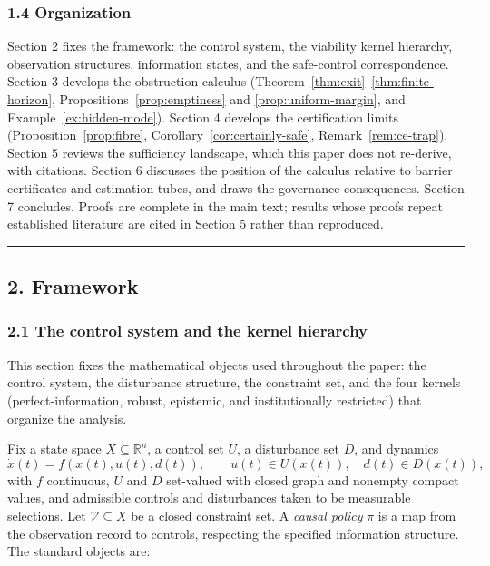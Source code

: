 \documentclass[11pt]{article}
\theoremstyle{definition}
\begin{document}
\subsubsection{1.4 Organization}\label{organization}

Section 2 fixes the framework: the control system, the viability kernel
hierarchy, observation structures, information states, and the
safe-control correspondence. Section 3 develops the obstruction calculus (Theorem~\ref{thm:exit}--\ref{thm:finite-horizon}, Propositions~\ref{prop:emptiness} and \ref{prop:uniform-margin}, and Example~\ref{ex:hidden-mode}). Section 4 develops the certification limits
(Proposition~\ref{prop:fibre}, Corollary~\ref{cor:certainly-safe}, Remark~\ref{rem:ce-trap}). Section 5 reviews the sufficiency
landscape, which this paper does not re-derive, with citations. Section
6 discusses the position of the calculus relative to barrier
certificates and estimation tubes, and draws the governance
consequences. Section 7 concludes. Proofs are complete in the main text;
results whose proofs repeat established literature are cited in Section 5 rather than reproduced.

\begin{center}\rule{0.5\linewidth}{0.5pt}\end{center}

\subsection{2. Framework}\label{framework}

\subsubsection{2.1 The control system and the kernel
hierarchy}\label{the-control-system-and-the-kernel-hierarchy}

This section fixes the mathematical objects used throughout the paper:
the control system, the disturbance structure, the constraint set, and
the four kernels (perfect-information, robust, epistemic, and
institutionally restricted) that organize the analysis.

Fix a state space \(X \subseteq \mathbb{R}^n\), a control set \(U\), a
disturbance set \(D\), and dynamics
\[\dot x(t) = f(x(t), u(t), d(t)), \qquad u(t) \in U(x(t)), \quad d(t) \in D(x(t)),\]
with \(f\) continuous, \(U\) and \(D\) set-valued with closed graph and
nonempty compact values, and admissible controls and disturbances taken
to be measurable selections. Let \(\mathcal{V} \subseteq X\) be a closed
constraint set. A \emph{causal policy} \(\pi\) is a map from the
observation record to controls, respecting the specified information structure. The standard objects are:
\end{document}
